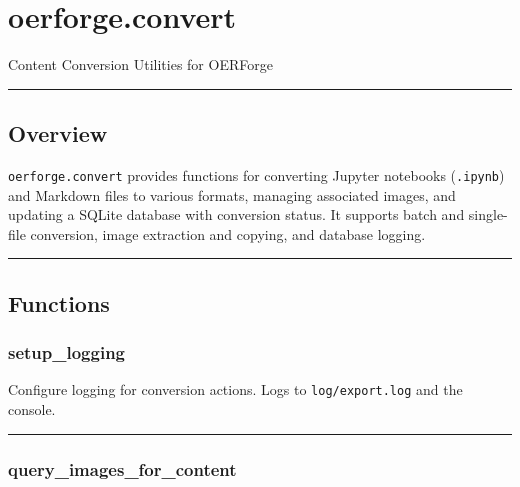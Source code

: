 \section{oerforge.convert}\label{oerforge.convert}

Content Conversion Utilities for OERForge

\begin{center}\rule{0.5\linewidth}{0.5pt}\end{center}

\subsection{Overview}\label{overview}

\texttt{oerforge.convert} provides functions for converting Jupyter
notebooks (\texttt{.ipynb}) and Markdown files to various formats,
managing associated images, and updating a SQLite database with
conversion status. It supports batch and single-file conversion, image
extraction and copying, and database logging.

\begin{center}\rule{0.5\linewidth}{0.5pt}\end{center}

\subsection{Functions}\label{functions}

\subsubsection{setup\_logging}\label{setup_logging}

\begin{Shaded}
\begin{Highlighting}[]
\end{Highlighting}
\end{Shaded}

Configure logging for conversion actions. Logs to
\texttt{log/export.log} and the console.

\begin{center}\rule{0.5\linewidth}{0.5pt}\end{center}

\subsubsection{query\_images\_for\_content}\label{query_images_for_content}

